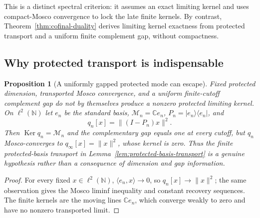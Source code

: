 \documentclass[11pt]{article}
\numberwithin{equation}{section}
\newtheorem{proposition}[theorem]{Proposition}
\theoremstyle{definition}
\theoremstyle{remark}
\newcommand{\N}{\mathbb N}
\newcommand{\C}{\mathbb C}
\newcommand{\Ker}{\operatorname{Ker}}
\newcommand{\M}{\mathcal M}
\begin{document}
This is a distinct spectral criterion: it assumes an exact limiting
kernel and uses compact-Mosco convergence to lock the late finite kernels.
By contrast, Theorem~\ref{thm:cofinal-duality} derives limiting kernel
exactness from protected transport and a uniform finite complement gap,
without compactness.


\subsection{Why protected transport is indispensable}

\begin{proposition}[A uniformly gapped protected mode can escape]
\label{cth:escaping-protected-mode}
Fixed protected dimension, transported Mosco convergence, and a uniform
finite-cutoff complement gap do not by themselves produce a nonzero protected
limiting kernel.  On $\ell^2(\N)$ let $e_n$ be the standard basis,
$\M_n=\C e_n$, $P_n=|e_n\rangle\langle e_n|$, and
\begin{equation}
 q_n[x]=\|(I-P_n)x\|^2.
 \label{eq:escaping-mode-form}
\end{equation}
Then $\Ker q_n=\M_n$ and the complementary gap equals one at every cutoff,
but $q_n$ Mosco-converges to $q_\infty[x]=\|x\|^2$, whose kernel is zero.
Thus the finite protected-basis transport in
Lemma~\ref{lem:protected-basis-transport} is a genuine hypothesis rather than
a consequence of dimension and gap information.
\end{proposition}

\begin{proof}
For every fixed $x\in\ell^2(\N)$, $\langle e_n,x\rangle\to0$, so
$q_n[x]\to\|x\|^2$; the same observation gives the Mosco liminf inequality
and constant recovery sequences.  The finite kernels are the moving lines
$\C e_n$, which converge weakly to zero and have no nonzero transported limit.
\end{proof}
\end{document}
